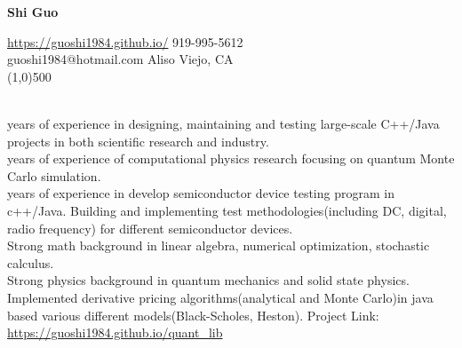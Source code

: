 \documentclass[11pt]{article} %
\begin{document}
 \centerline{\Large \bf Shi Guo}
  \noindent \url{https://guoshi1984.github.io/} \hspace{80mm}  919-995-5612\\
    guoshi1984@hotmail.com \hspace{95mm}   Aliso Viejo, CA\\
\line(1,0){500}


\vspace{1mm}

\\
 years of experience in designing, maintaining and testing large-scale C++/Java projects in both scientific research and industry.  \\
 years of experience of computational physics research focusing on quantum Monte Carlo simulation.\\
 years of experience in develop semiconductor device testing program in c++/Java. Building and implementing test methodologies(including DC, digital, radio frequency) for different semiconductor devices. \\
\noindent Strong math background in linear algebra, numerical optimization, stochastic calculus.  \\
\noindent Strong physics background in quantum mechanics and solid state physics.\\
 Implemented derivative pricing algorithms(analytical and Monte Carlo)in java based various different models(Black-Scholes, Heston). Project Link:  \url{https://guoshi1984.github.io/quant_lib} \\

\vspace{2mm}




\vspace{2mm}
\end{document}
